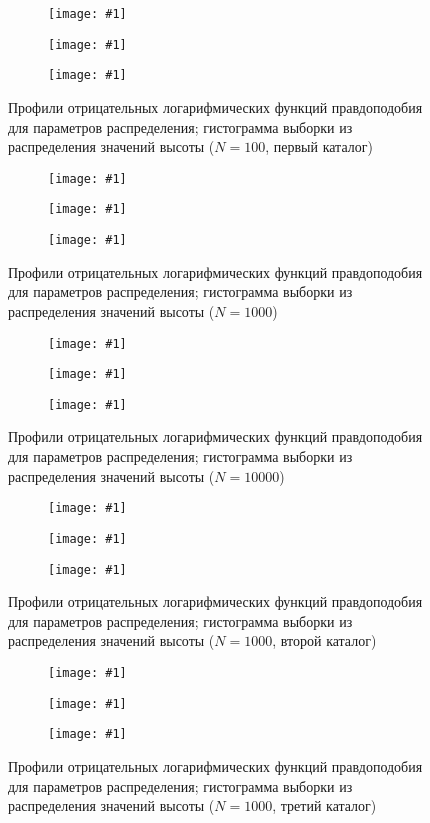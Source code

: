 \documentclass[a4paper, oneside]{article}
\newlength{\imagewidth}
\newlength{\imageheight}
\newcommand{\subgraphics}[1]{
\settowidth{\imagewidth}{\texttt{[image: \#1]}}%
\begin{subfigure}{\imagewidth}%
    \texttt{[image: \#1]}%
\end{subfigure}%
}
\begin{document}
\newpage

\begin{figure}[h!]
  \centering
  \setlength{\imageheight}{4.1cm}
  \subgraphics{fit_uniform_disk/1, 100/μ profile}
  \subgraphics{fit_uniform_disk/1, 100/b profile}
  \subgraphics{fit_uniform_disk/1, 100/Histogram Z}
  \caption{Профили отрицательных логарифмических функций правдоподобия для параметров распределения; гистограмма выборки из распределения значений высоты ($ N = 100 $, первый каталог)}
\end{figure}

\begin{figure}[h!]
  \centering
  \setlength{\imageheight}{4.1cm}
  \subgraphics{fit_uniform_disk/1, 1000/μ profile}
  \subgraphics{fit_uniform_disk/1, 1000/b profile}
  \subgraphics{fit_uniform_disk/1, 1000/Histogram Z}
  \caption{Профили отрицательных логарифмических функций правдоподобия для параметров распределения; гистограмма выборки из распределения значений высоты ($ N = 1000 $)}
\end{figure}

\newpage

\begin{figure}[h!]
  \centering
  \setlength{\imageheight}{4.1cm}
  \subgraphics{fit_uniform_disk/1, 10000/μ profile}
  \subgraphics{fit_uniform_disk/1, 10000/b profile}
  \subgraphics{fit_uniform_disk/1, 10000/Histogram Z}
  \caption{Профили отрицательных логарифмических функций правдоподобия для параметров распределения; гистограмма выборки из распределения значений высоты ($ N = 10000 $)}
\end{figure}

\begin{figure}[h!]
  \centering
  \setlength{\imageheight}{4.1cm}
  \subgraphics{fit_uniform_disk/2, 1000/μ profile}
  \subgraphics{fit_uniform_disk/2, 1000/b profile}
  \subgraphics{fit_uniform_disk/2, 1000/Histogram Z}
  \caption{Профили отрицательных логарифмических функций правдоподобия для параметров распределения; гистограмма выборки из распределения значений высоты ($ N = 1000 $, второй каталог)}
\end{figure}

\newpage

\begin{figure}[h!]
  \centering
  \setlength{\imageheight}{4.1cm}
  \subgraphics{fit_uniform_disk/3, 1000/μ profile}
  \subgraphics{fit_uniform_disk/3, 1000/b profile}
  \subgraphics{fit_uniform_disk/3, 1000/Histogram Z}
  \caption{Профили отрицательных логарифмических функций правдоподобия для параметров распределения; гистограмма выборки из распределения значений высоты ($ N = 1000 $, третий каталог)}
\end{figure}
\end{document}
